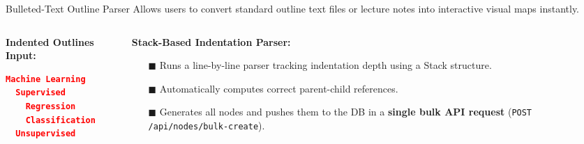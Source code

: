 \documentclass[aspectratio=169, 10pt]{beamer}
\begin{document}
\begin{frame}[fragile]{Bulleted-Text Outline Parser}
  Allows users to convert standard outline text files or lecture notes into interactive visual maps instantly.
  \vspace{0.5em}
  \begin{columns}
    \begin{column}{0.4\textwidth}
      \textbf{Indented Outlines Input:}
      \begin{lstlisting}[language=json, caption=Bulleted Text Outline]
Machine Learning
  Supervised
    Regression
    Classification
  Unsupervised
      \end{lstlisting}
    \end{column}
    \begin{column}{0.6\textwidth}
      \textbf{Stack-Based Indentation Parser:}
      \begin{itemize}
        \item[\textcolor{axonpurple}{\tiny$\blacksquare$}] Runs a line-by-line parser tracking indentation depth using a Stack structure.
        \item[\textcolor{axonpurple}{\tiny$\blacksquare$}] Automatically computes correct parent-child references.
        \item[\textcolor{axonpurple}{\tiny$\blacksquare$}] Generates all nodes and pushes them to the DB in a \textbf{single bulk API request} (\texttt{POST /api/nodes/bulk-create}).
      \end{itemize}
    \end{column}
  \end{columns}
\end{frame}
\end{document}
